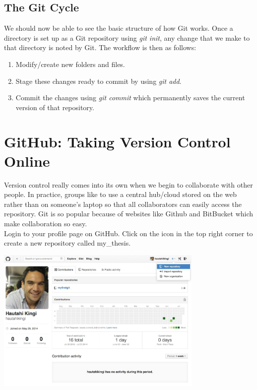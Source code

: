 \documentclass{article}
\begin{document}
\subsection{The Git Cycle}
We should now be able to see the basic structure of how Git works. Once a directory is set up as a Git repository using \emph{git init}, any change that we make to that directory is noted by Git. The workflow is then as follows:
\begin{enumerate}
\item
Modify/create new folders and files.
\item
Stage these changes ready to commit by using \emph{git add}.
\item
Commit the changes using \emph{git commit} which permanently saves the current version of that repository.
\end{enumerate}

\newpage
\section{GitHub: Taking Version Control Online}

Version control really comes into its own when we begin to collaborate with other people. In practice, groups like to use a central hub/cloud stored on the web rather than on someone's laptop so that all collaborators can easily access the repository. Git is so popular because of websites like Github and BitBucket which make collaboration so easy.\\

Login to your profile page on GitHub. Click on the icon in the top right corner to create a new repository called my\_thesis.
\begin{center}
\includegraphics[width=10cm]{./auxfiles/Ghub.jpg}
\end{center}
\end{document}
